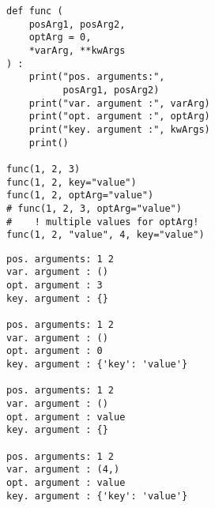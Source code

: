 \begin{frame}[fragile]
%
\begin{tcbraster}[raster columns=2,
                  raster equal height,
                  nobeforeafter,
                  raster column skip=0.5cm]
\begin{codebox}
\begin{verbatim}
def func (
    posArg1, posArg2,
    optArg = 0,
    *varArg, **kwArgs
) :
    print("pos. arguments:",
          posArg1, posArg2)
    print("var. argument :", varArg)
    print("opt. argument :", optArg)
    print("key. argument :", kwArgs)
    print()

func(1, 2, 3)
func(1, 2, key="value")
func(1, 2, optArg="value")
# func(1, 2, 3, optArg="value")
#    ! multiple values for optArg!
func(1, 2, "value", 4, key="value")
\end{verbatim}
\end{codebox}
%
\begin{cmdbox}
\begin{verbatim}
pos. arguments: 1 2
var. argument : ()
opt. argument : 3
key. argument : {}

pos. arguments: 1 2
var. argument : ()
opt. argument : 0
key. argument : {'key': 'value'}

pos. arguments: 1 2
var. argument : ()
opt. argument : value
key. argument : {}

pos. arguments: 1 2
var. argument : (4,)
opt. argument : value
key. argument : {'key': 'value'}
\end{verbatim}
\end{cmdbox}
\end{tcbraster}
%
\end{frame}


